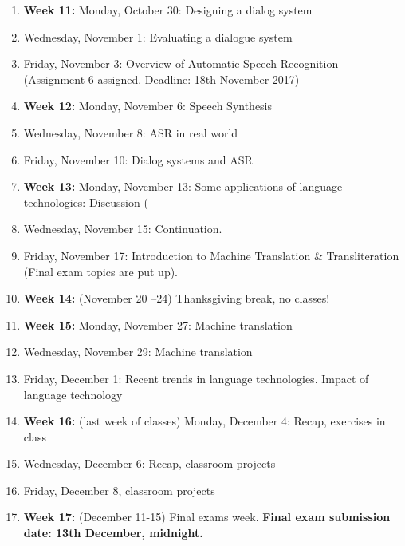 \documentclass[11pt,a4paper]{article}
\begin{document}
\begin{enumerate}
\item \textbf{Week 11:} Monday, October 30:  Designing a dialog system

\item Wednesday, November 1: Evaluating a dialogue system 

\item Friday, November 3: Overview of Automatic Speech Recognition
\\ (Assignment 6 assigned. Deadline: 18th November 2017) %

\item \textbf{Week 12:} Monday, November 6: Speech Synthesis 

\item Wednesday, November 8:  ASR in real world

\item Friday, November 10: Dialog systems and ASR

\item \textbf{Week 13:} Monday, November 13: Some applications of language technologies: Discussion (%

\item Wednesday, November 15:  Continuation. 

\item Friday, November 17: Introduction to Machine Translation \& Transliteration
\\ (Final exam topics are put up).

\item \textbf{Week 14:} (November 20 --24) Thanksgiving break, no classes!

\item \textbf{Week 15: } Monday, November 27:  Machine translation

\item Wednesday, November 29: Machine translation

\item Friday, December 1: Recent trends in language technologies. Impact of language technology

\item \textbf{Week 16: } (last week of classes) Monday, December 4: Recap, exercises in class

\item Wednesday, December 6: Recap, classroom projects

\item Friday, December 8, classroom projects

\item \textbf{Week 17: } (December 11-15) Final exams week. 
\textbf{Final exam submission date: 13th December, midnight.}

\end{enumerate}
\end{document}
